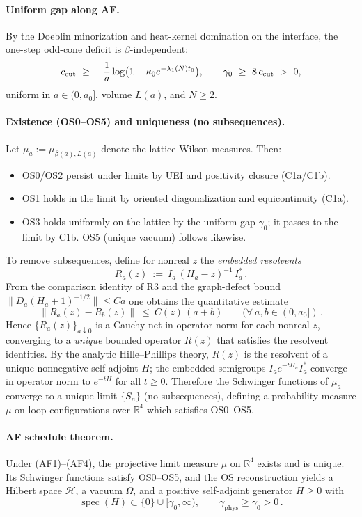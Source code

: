 \documentclass[11pt]{amsart}
\begin{document}
\paragraph{Uniform gap along AF.}
By the Doeblin minorization and heat-kernel domination on the interface, the one-step odd-cone deficit is $\beta$-independent:
\[
  c_{\rm cut}\ \ge\ -\frac{1}{a}\log\bigl(1-\kappa_0 e^{-\lambda_1(N) t_0}\bigr),\qquad
  \gamma_0\ \ge\ 8\,c_{\rm cut}\ >\ 0,
\]
uniform in $a\in(0,a_0]$, volume $L(a)$, and $N\ge 2$.

\paragraph{Existence (OS0--OS5) and uniqueness (no subsequences).}
Let $\mu_{a}:=\mu_{\beta(a),L(a)}$ denote the lattice Wilson measures. Then:
\begin{itemize}
  \item OS0/OS2 persist under limits by UEI and positivity closure (C1a/C1b).
  \item OS1 holds in the limit by oriented diagonalization and equicontinuity (C1a).
  \item OS3 holds uniformly on the lattice by the uniform gap $\gamma_0$; it passes to the limit by C1b. OS5 (unique vacuum) follows likewise.
\end{itemize}
To remove subsequences, define for nonreal $z$ the \emph{embedded resolvents}
\[
  R_a(z)\ :=\ I_a\,(H_a-z)^{-1}\,I_a^*\,.
\]
From the comparison identity of R3 and the graph-defect bound $\|D_a(H_a+1)^{-1/2}\|\le C a$ one obtains the quantitative estimate
\begin{equation}
\label{eq:cauchy-res}
  \big\|R_a(z)-R_b(z)\big\|\ \le\ C(z)\,(a+b)\qquad(\forall\ a,b\in(0,a_0])\,.
\end{equation}
Hence $\{R_a(z)\}_{a\downarrow 0}$ is a Cauchy net in operator norm for each nonreal $z$, converging to a \emph{unique} bounded operator $R(z)$ that satisfies the resolvent identities. By the analytic Hille--Phillips theory, $R(z)$ is the resolvent of a unique nonnegative self-adjoint $H$; the embedded semigroups $I_a e^{-tH_a} I_a^*$ converge in operator norm to $e^{-tH}$ for all $t\ge 0$. Therefore the Schwinger functions of $\mu_a$ converge to a unique limit $\{S_n\}$ (no subsequences), defining a probability measure $\mu$ on loop configurations over $\mathbb R^4$ which satisfies OS0--OS5.

\paragraph{AF schedule theorem.}
\begin{theorem}
Under (AF1)--(AF4), the projective limit measure $\mu$ on $\mathbb R^4$ exists and is unique. Its Schwinger functions satisfy OS0--OS5, and the OS reconstruction yields a Hilbert space $\mathcal H$, a vacuum $\Omega$, and a positive self-adjoint generator $H\ge 0$ with
\[
  \operatorname{spec}(H)\subset\{0\}\cup[\gamma_0,\infty),\qquad \gamma_{\mathrm{phys}}\ge \gamma_0>0\,.
\]
\end{theorem}
\end{document}
